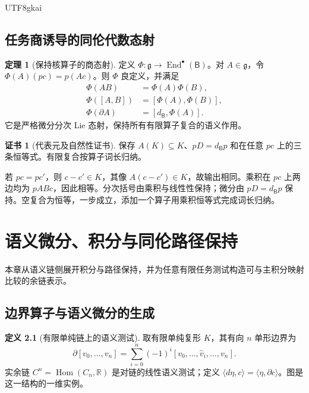 \documentclass[12pt]{report}
\makeatletter
\theoremstyle{definition}
\newtheorem{definition}{定义}[chapter]
\newtheorem{theorem}{定理}[chapter]
\newtheorem{Certificate}{证书}[chapter]
\renewenvironment{proof}[1][\proofname]{\par
  \pushQED{\qed}\normalfont
  \topsep6\p@\@plus6\p@\relax
  \trivlist
  \item[\hskip\labelsep\normalfont #1\@addpunct{.}]\ignorespaces
}{
  \popQED\endtrivlist\@endpefalse
}
\newcommand{\RR}{\mathbb R}
\newcommand{\End}{\operatorname{End}}
\newcommand{\Hom}{\operatorname{Hom}}
\makeatother
\begin{document}
\begin{CJK*}{UTF8}{gkai}
\section{任务商诱导的同伦代数态射}
\begin{theorem}[保持核算子的商态射]
\label{thm:functor}
定义 \(\Phi:\mathfrak g\to\End^\bullet(\mathsf B)\)。对 \(A\in\mathfrak g\)，令
\(\Phi(A)(pc)=p(Ac)\)。则 \(\Phi\) 良定义，并满足
\[
\begin{aligned}
\Phi(AB)&=\Phi(A)\Phi(B),\\
\Phi([A,B])&=[\Phi(A),\Phi(B)],\\
\Phi(\partial A)&=[d_{\mathsf B},\Phi(A)].
\end{aligned}
\]
它是严格微分分次 Lie 态射，保持所有有限算子复合的语义作用。
\end{theorem}
\begin{Certificate}[代表元及自然性证书]
保存 \(A(K)\subseteq K\)、\(pD=d_{\mathsf B}p\) 和在任意 \(pc\) 上的三条恒等式。有限复合按算子词长归纳。
\end{Certificate}
\begin{proof}
若 \(pc=pc'\)，则 \(c-c'\in K\)，其像 \(A(c-c')\in K\)，故输出相同。乘积在 \(pc\) 上两边均为 \(pABc\)，因此相等。分次括号由乘积与线性性保持；微分由 \(pD=d_{\mathsf B}p\) 保持。空复合为恒等，一步成立，添加一个算子用乘积恒等式完成词长归纳。
\end{proof}

\chapter{语义微分、积分与同伦路径保持}
\label{sec:calculus}
本章从语义链侧展开积分与路径保持，并为任意有限任务测试构造可与主积分映射比较的余链表示。
\section{边界算子与语义微分的生成}
\begin{definition}[有限单纯链上的语义测试]
取有限单纯复形 \(K\)，其有向 \(n\) 单形边界为
\[
\partial[v_0,\ldots,v_n]=\sum_{i=0}^n(-1)^i[v_0,\ldots,\widehat v_i,\ldots,v_n].
\]
实余链 \(C^n=\Hom(C_n,\RR)\) 是对链的线性语义测试；定义
\(\langle d\eta,c\rangle=\langle\eta,\partial c\rangle\)。图是这一结构的一维实例。
\end{definition}


\end{CJK*}
\end{document}
